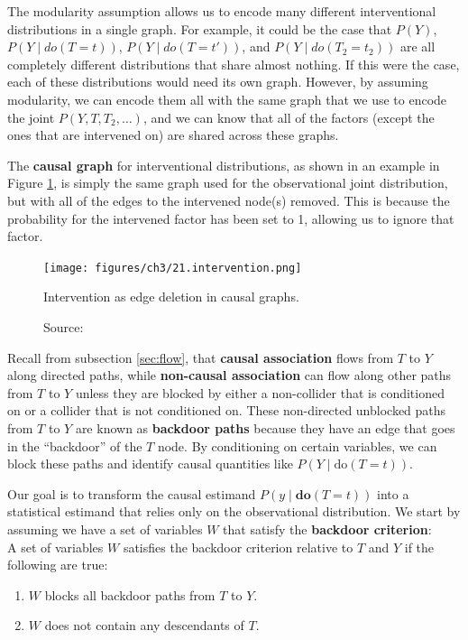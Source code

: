 The modularity assumption allows us to encode many different interventional
distributions in a single graph. For example, it could be the case that
\( P(Y) \), \( P(Y \mid do(T = t)) \), \( P(Y \mid do(T = t')) \), and
\( P(Y \mid do(T_2 = t_2)) \) are all completely different distributions that
share almost nothing. If this were the case, each of these distributions would
need its own graph. However, by assuming modularity, we can encode them all
with the same graph that we use to encode the joint \( P(Y, T, T_2, \ldots) \),
and we can know that all of the factors (except the ones that are intervened on)
are shared across these graphs.

The \textbf{causal graph} for interventional distributions,
as shown in an example in Figure \ref{fig:intervention},
is simply the same graph used for the observational joint distribution,
but with all of the edges to the intervened node(s) removed.
This is because the probability for the intervened factor has been set to 1,
allowing us to ignore that factor.

\begin{figure}[h]
    \centering
    \texttt{[image: figures/ch3/21.intervention.png]}
    \caption{Intervention as edge deletion in causal graphs.}
    \vspace{-10px}
    \caption*{\scriptsize{Source: \cite{Neal_2020a}}}
    \label{fig:intervention}
\end{figure}

Recall from subsection \ref{sec:flow}, that \textbf{causal association}
flows from \( T \) to \( Y \) along directed paths,
while \textbf{non-causal association} can flow along other
paths from \( T \) to \( Y \) unless they are blocked by either
a non-collider that is conditioned on or a collider that is not
conditioned on. These non-directed unblocked paths from
\( T \) to \( Y \) are known as \textbf{backdoor paths}
because they have an edge that goes in the ``backdoor'' of the \( T \) node.
By conditioning on certain variables, we can block these paths and
identify causal quantities like \( P(Y \mid \text{do}(T = t)) \).

Our goal is to transform the causal estimand
\( P(y \mid \textbf{do}(T = t)) \) into a statistical estimand
that relies only on the observational distribution.
We start by assuming we have a set of variables \( W \) that satisfy
the \textbf{backdoor criterion}:\\
A set of variables \( W \) satisfies the backdoor criterion relative to \( T \) and \( Y \) if the following are true:
\begin{enumerate}
    \item \( W \) blocks all backdoor paths from \( T \) to \( Y \).
    \item \( W \) does not contain any descendants of \( T \).
\end{enumerate}

